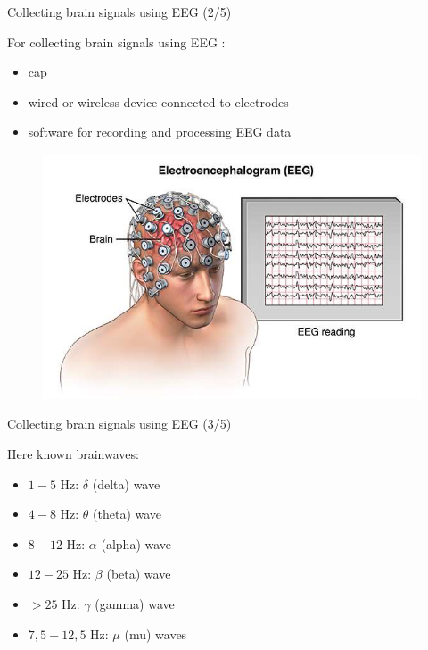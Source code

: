 \documentclass{beamer}
\begin{document}
\begin{frame}
{\centerline{Collecting brain signals using EEG (2/5)}}
    For collecting brain signals using EEG :
    \begin{itemize}
        \item cap
        \item wired or wireless device connected to electrodes
        \item software for recording and processing EEG data
    \end{itemize}
    \begin{figure}
        \centering
        \includegraphics[width=\linewidth]{P2023.AIBCCSS.BrainSignals/EEG reading.png}
    \end{figure}
\end{frame}

\begin{frame}
{\centerline{Collecting brain signals using EEG (3/5)}}
Here known brainwaves:
\begin{itemize}
    \item $1-5$ Hz: $\delta$ (delta) wave
    \item $4-8$ Hz: $\theta$ (theta) wave
    \item $8-12$ Hz: $\alpha$ (alpha) wave
    \item $12-25$ Hz: $\beta$ (beta) wave
    \item $> 25$ Hz: $\gamma$ (gamma) wave
    \item $7,5-12,5$ Hz: $\mu$ (mu) waves
\end{itemize}
\end{frame}
\end{document}
